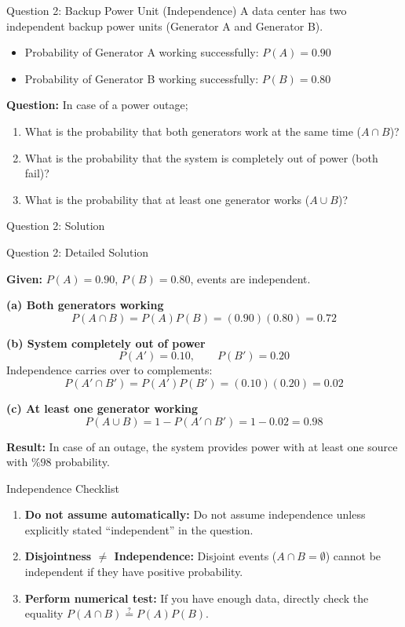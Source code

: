 \documentclass[light]{lutbeamer}
\begin{document}
\begin{frame}{Question 2: Backup Power Unit (Independence)}
    A data center has two independent backup power units (Generator A and Generator B).
    \begin{itemize}
        \item Probability of Generator A working successfully: $P(A) = 0.90$
        \item Probability of Generator B working successfully: $P(B) = 0.80$
    \end{itemize}

    \textbf{Question:} In case of a power outage;
    \begin{enumerate}
        \item[(a)] What is the probability that both generators work at the same time ($A \cap B$)?
        \item[(b)] What is the probability that the system is completely out of power (both fail)?
        \item[(c)] What is the probability that at least one generator works ($A \cup B$)?
    \end{enumerate}
\end{frame}

\begin{frame}{Question 2: Solution}
    \vspace{5cm}
\end{frame}

\begin{frame}[allowframebreaks]{Question 2: Detailed Solution}
    \small
    {\color{red}
    \textbf{Given:} \(P(A)=0.90\), \(P(B)=0.80\), events are independent.

    \textbf{(a) Both generators working}
    \[
    P(A\cap B)=P(A)P(B)=(0.90)(0.80)=\mathbf{0.72}
    \]

    \textbf{(b) System completely out of power}
    \[
    P(A')=0.10,\qquad P(B')=0.20
    \]
    Independence carries over to complements:
    \[
    P(A'\cap B')=P(A')P(B')=(0.10)(0.20)=\mathbf{0.02}
    \]

    \textbf{(c) At least one generator working}
    \[
    P(A\cup B)=1-P(A'\cap B')=1-0.02=\mathbf{0.98}
    \]

    \textbf{Result:} In case of an outage, the system provides power with at least one source with \(\%98\) probability.
    }
\end{frame}



\begin{frame}{Independence Checklist}
    \begin{enumerate}
        \item \textbf{Do not assume automatically:} Do not assume independence unless explicitly stated ``independent'' in the question.
        \item \textbf{Disjointness $\neq$ Independence:} Disjoint events ($A\cap B=\emptyset$) cannot be independent if they have positive probability.
        \item \textbf{Perform numerical test:} If you have enough data, directly check the equality \(P(A\cap B)\stackrel{?}{=}P(A)P(B)\).
    \end{enumerate}
\end{frame}
\end{document}
